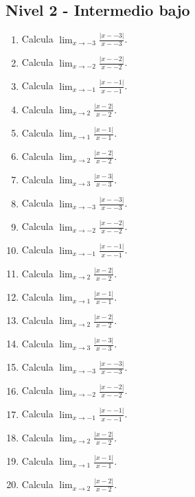 \documentclass[11pt,a4paper]{article}
\begin{document}
\subsection{Nivel 2 - Intermedio bajo}

\begin{enumerate}[label=\textbf{E\arabic*.},start=621]

\item Calcula $\displaystyle\lim_{x\to -3}\frac{|x--3|}{x--3}$. 

\item Calcula $\displaystyle\lim_{x\to -2}\frac{|x--2|}{x--2}$. 

\item Calcula $\displaystyle\lim_{x\to -1}\frac{|x--1|}{x--1}$. 

\item Calcula $\displaystyle\lim_{x\to 2}\frac{|x-2|}{x-2}$. 

\item Calcula $\displaystyle\lim_{x\to 1}\frac{|x-1|}{x-1}$. 

\item Calcula $\displaystyle\lim_{x\to 2}\frac{|x-2|}{x-2}$. 

\item Calcula $\displaystyle\lim_{x\to 3}\frac{|x-3|}{x-3}$. 

\item Calcula $\displaystyle\lim_{x\to -3}\frac{|x--3|}{x--3}$. 

\item Calcula $\displaystyle\lim_{x\to -2}\frac{|x--2|}{x--2}$. 

\item Calcula $\displaystyle\lim_{x\to -1}\frac{|x--1|}{x--1}$. 

\item Calcula $\displaystyle\lim_{x\to 2}\frac{|x-2|}{x-2}$. 

\item Calcula $\displaystyle\lim_{x\to 1}\frac{|x-1|}{x-1}$. 

\item Calcula $\displaystyle\lim_{x\to 2}\frac{|x-2|}{x-2}$. 

\item Calcula $\displaystyle\lim_{x\to 3}\frac{|x-3|}{x-3}$. 

\item Calcula $\displaystyle\lim_{x\to -3}\frac{|x--3|}{x--3}$. 

\item Calcula $\displaystyle\lim_{x\to -2}\frac{|x--2|}{x--2}$. 

\item Calcula $\displaystyle\lim_{x\to -1}\frac{|x--1|}{x--1}$. 

\item Calcula $\displaystyle\lim_{x\to 2}\frac{|x-2|}{x-2}$. 

\item Calcula $\displaystyle\lim_{x\to 1}\frac{|x-1|}{x-1}$. 

\item Calcula $\displaystyle\lim_{x\to 2}\frac{|x-2|}{x-2}$. 

\end{enumerate}
\end{document}
